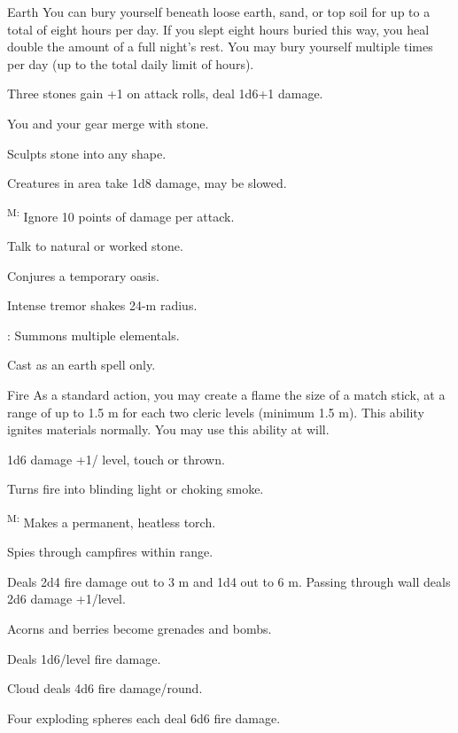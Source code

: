 {Earth}
{You can bury yourself beneath loose earth, sand, or top soil for up to a total of eight hours per day. If you slept eight hours buried this way, you heal double the amount of a full night's rest. You may bury yourself multiple times per day (up to the total daily limit of hours).}
{
	\item {} Three stones gain +1 on attack rolls, deal 1d6+1 damage.
	\item {} You and your gear merge with stone.
	\item {} Sculpts stone into any shape.
	\item {} Creatures in area take 1d8 damage, may be slowed.
	\item {}\textsuperscript{M:} Ignore 10 points of damage per attack.
	\item {} Talk to natural or worked stone.
	\item {} Conjures a temporary oasis.
	\item {} Intense tremor shakes 24-m radius.
	\item {}\footnotemark[1]: Summons multiple elementals.
}
 Cast as an earth spell only.

{Fire}
{As a standard action, you may create a flame the size of a match stick, at a range of up to 1.5 m for each two cleric levels (minimum 1.5 m). This ability ignites materials normally. You may use this ability at will.}
{
	\item {} 1d6 damage +1/ level, touch or thrown.
	\item {} Turns fire into blinding light or choking smoke.
	\item {}\textsuperscript{M:} Makes a permanent, heatless torch.
	\item {} Spies through campfires within range.
	\item {} Deals 2d4 fire damage out to 3 m and 1d4 out to 6 m. Passing through wall deals 2d6 damage +1/level.
	\item {} Acorns and berries become grenades and bombs.
	\item {} Deals 1d6/level fire damage.
	\item {} Cloud deals 4d6 fire damage/round.
	\item {} Four exploding spheres each deal 6d6 fire damage.
}

